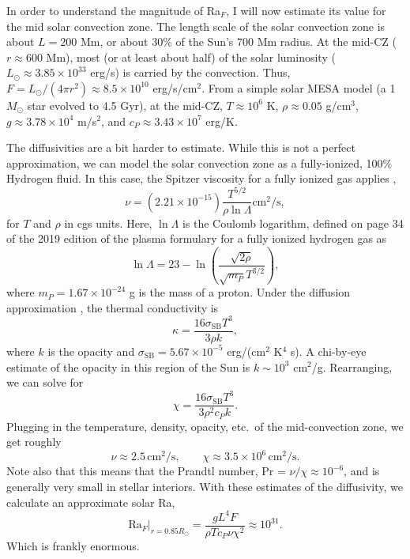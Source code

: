 In order to understand the magnitude of Ra$_F$, I will now estimate its value for the mid solar convection zone.
The length scale of the solar convection zone is about $L = 200$ Mm, or about 30\% of the Sun's 700 Mm radius.
At the mid-CZ ($r \approx 600$ Mm), most (or at least about half) of the solar luminosity ($L_\odot \approx 3.85 \times 10^{33}$ erg/s) is carried by the convection.
Thus, $F = L_{\odot} / (4\pi r^2) \approx 8.5 \times 10^{10}$ erg/s/cm$^2$.
From a simple solar MESA model (a 1 $M_\odot$ star evolved to 4.5 Gyr), at the mid-CZ, $T \approx 10^6$ K, $\rho \approx 0.05$ g/cm$^3$, $g \approx 3.78 \times 10^4$ m/s$^2$, and $c_P \approx 3.43 \times 10^{7}$ erg/K.

The diffusivities are a bit harder to estimate.
While this is not a perfect approximation, we can model the solar convection zone as a fully-ionized, 100\% Hydrogen fluid.
In this case, the Spitzer viscosity for a fully ionized gas applies \citep[Eqn.~5-54 of][]{spitzer1962},
\begin{equation}
\nu = (2.21 \times 10^{-15}) \frac{T^{5/2}}{\rho \ln \Lambda} \text{cm}^2/\text{s},
\end{equation}
for $T$ and $\rho$ in cgs units.
Here, $\ln\Lambda$ is the Coulomb logarithm, defined on page 34 of the 2019 edition of the plasma formulary for a fully ionized hydrogen gas as
\begin{equation}
\ln \Lambda = 23 - \ln\left(\frac{\sqrt{2\rho}}{\sqrt{m_P}T^{3/2}}\right),
\end{equation}
where $m_P = 1.67 \times 10^{-24}$ g is the mass of a proton.
Under the diffusion approximation \citep[e.g., ch.~14.A-6 of][]{weiss&all2004}, the thermal conductivity is 
\begin{equation}
\kappa = \frac{16 \sigma_{\text{SB}} T^3}{3\rho k},
\end{equation}
where $k$ is the opacity and $\sigma_{\text{SB}} = 5.67 \times 10^{-5}$ erg/(cm$^2$ K$^4$ s).
A chi-by-eye estimate of the opacity in this region of the Sun \citep[from OPAL opacities and Fig.~3 of][]{paxton&all2011} is $k \sim 10^3$ cm$^2$/g.
Rearranging, we can solve for
$$
\chi = \frac{16 \sigma_{\text{SB}} T^3}{3\rho^2 c_P k}.
$$
Plugging in the temperature, density, opacity, etc.~of the mid-convection zone, we get roughly
\begin{equation}
\nu \approx 2.5 \,\text{cm}^2/\text{s}, \qquad
\chi \approx 3.5 \times 10^{6}\,\text{cm}^2/\text{s}.
\end{equation}
Note also that this means that the Prandtl number, Pr = $\nu/\chi \approx  10^{-6}$, and is generally very small in stellar interiors.
With these estimates of the diffusivity, we calculate an approximate solar Ra,
\begin{equation}
\text{Ra}_F\bigg|_{r=0.85 R_\odot} = \frac{g L^4 F}{\rho T c_P \nu \chi^2} \approx 10^{31}.
\end{equation}
Which is frankly enormous.

